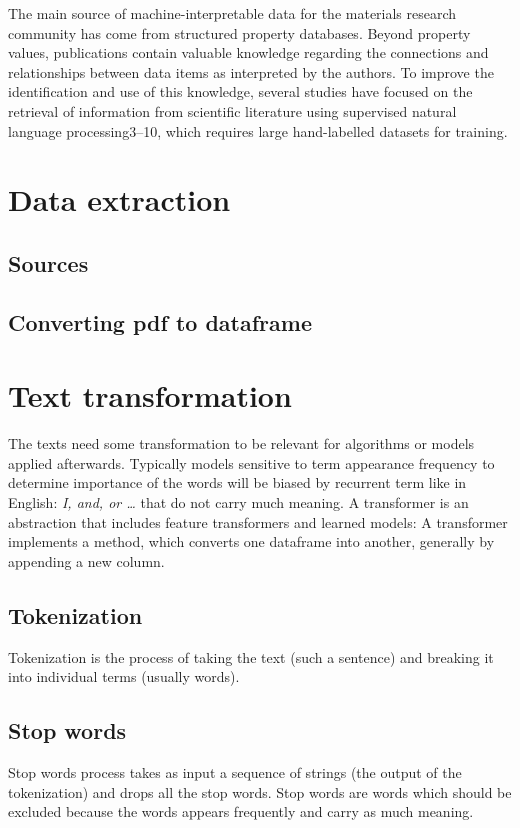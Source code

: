 
The main source of machine-interpretable data for the materials research community has come from structured property databases. Beyond property values, publications contain valuable knowledge regarding the connections and relationships between data items as interpreted by the authors. To improve the identification and use of this knowledge, several studies have focused on the retrieval of information from scientific literature using supervised natural language processing3–10, which requires large hand-labelled datasets for training.
 
\section{Data extraction}

\subsection{Sources}
\subsection{Converting pdf to dataframe}

\section{Text transformation}
The texts need some transformation to be relevant for algorithms or models applied afterwards. Typically models sensitive to term appearance frequency to determine importance of the words will be biased by recurrent term like in English: \textit{I, and, or \ldots} that do not carry much meaning.
\newline
A transformer is an abstraction that includes feature transformers and learned models: \ie A transformer implements a method, which converts one dataframe into another, generally by appending a new column.  

\subsection{Tokenization}
Tokenization is the process of taking the text (such a sentence) and breaking it into individual terms (usually words).

\subsection{Stop words}
Stop words process takes as input a sequence of strings (\eg the output of the tokenization) and drops all the stop words.
\newline
Stop words are words which should be excluded because the words appears frequently and carry as much meaning. 

